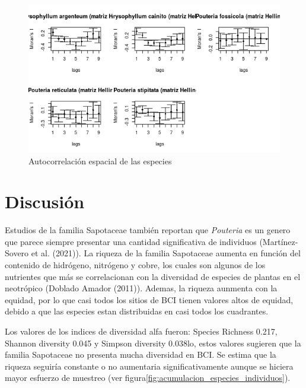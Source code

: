 \documentclass[11pt,]{article}
\begin{document}
\begin{figure}
\centering
\includegraphics[width=1.00000\textwidth]{Abundancia_matriz.png}
\caption{Autocorrelación espacial de las especies
\label{fig:Abundancia_matriz}}
\end{figure}

\section{Discusión}\label{discusiuxf3n}

Estudios de la familia Sapotaceae también reportan que \emph{Pouteria}
es un genero que parece siempre presentar una cantidad significativa de
individuos (Martínez-Sovero et al. (2021)). La riqueza de la familia
Sapotaceae aumenta en función del contenido de hidrógeno, nitrógeno y
cobre, los cuales son algunos de los nutrientes que más se correlacionan
con la diversidad de especies de plantas en el neotrópico (Doblado
Amador (2011)). Ademas, la riqueza aunmenta con la equidad, por lo que
casi todos los sitios de BCI tienen valores altos de equidad, debido a
que las especies estan distribuidas en casi todos los cuadrantes.

Los valores de los indices de diversidad alfa fueron: Species Richness
0.217, Shannon diversity 0.045 y Simpson diversity 0.038lo, estos
valores sugieren que la familia Sapotaceae no presenta mucha diversidad
en BCI. Se estima que la riqueza seguiría constante o no aumentaria
significativamente aunque se hiciera mayor esfuerzo de muestreo (ver
figura\ref{fig:acumulacion_especies_individuos}).
\end{document}
